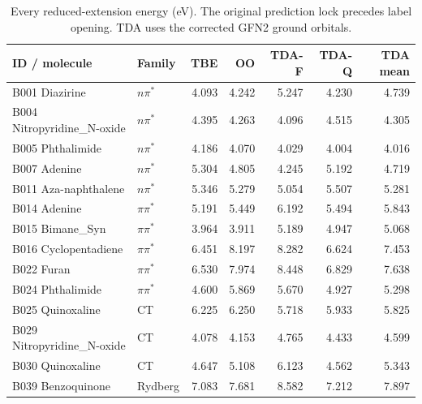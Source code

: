 \begin{longtable}{llrrrrr}
\caption{Every reduced-extension energy (eV). The original prediction lock precedes label opening. TDA uses the corrected GFN2 ground orbitals.}\label{tab:extensionall}\\
\toprule
ID / molecule & Family & TBE & OO & TDA-F & TDA-Q & TDA mean \\
\midrule\endhead
B001 Diazirine & $n\pi^*$ & 4.093 & 4.242 & 5.247 & 4.230 & 4.739 \\
B004 Nitropyridine\_N-oxide & $n\pi^*$ & 4.395 & 4.263 & 4.096 & 4.515 & 4.305 \\
B005 Phthalimide & $n\pi^*$ & 4.186 & 4.070 & 4.029 & 4.004 & 4.016 \\
B007 Adenine & $n\pi^*$ & 5.304 & 4.805 & 4.245 & 5.192 & 4.719 \\
B011 Aza-naphthalene & $n\pi^*$ & 5.346 & 5.279 & 5.054 & 5.507 & 5.281 \\
B014 Adenine & $\pi\pi^*$ & 5.191 & 5.449 & 6.192 & 5.494 & 5.843 \\
B015 Bimane\_Syn & $\pi\pi^*$ & 3.964 & 3.911 & 5.189 & 4.947 & 5.068 \\
B016 Cyclopentadiene & $\pi\pi^*$ & 6.451 & 8.197 & 8.282 & 6.624 & 7.453 \\
B022 Furan & $\pi\pi^*$ & 6.530 & 7.974 & 8.448 & 6.829 & 7.638 \\
B024 Phthalimide & $\pi\pi^*$ & 4.600 & 5.869 & 5.670 & 4.927 & 5.298 \\
B025 Quinoxaline & CT & 6.225 & 6.250 & 5.718 & 5.933 & 5.825 \\
B029 Nitropyridine\_N-oxide & CT & 4.078 & 4.153 & 4.765 & 4.433 & 4.599 \\
B030 Quinoxaline & CT & 4.647 & 5.108 & 6.123 & 4.562 & 5.343 \\
B039 Benzoquinone & Rydberg & 7.083 & 7.681 & 8.582 & 7.212 & 7.897 \\
\bottomrule
\end{longtable}
